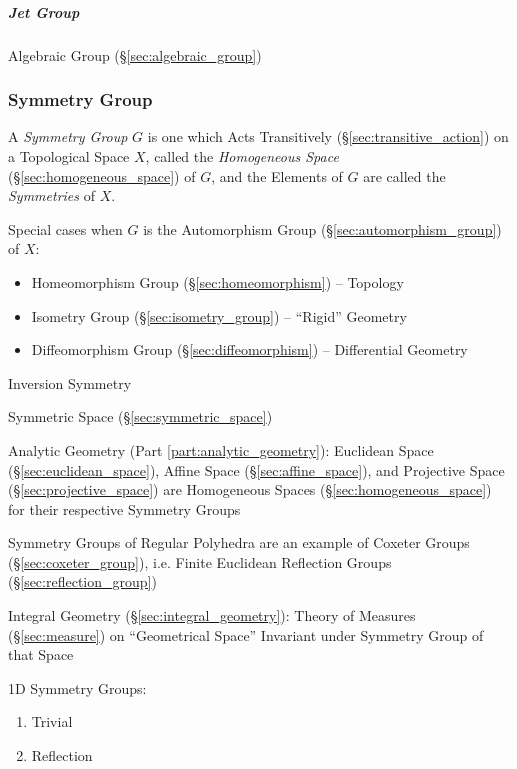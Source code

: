 \subparagraph{Jet Group}\label{sec:jet_group}\hfill

Algebraic Group (\S\ref{sec:algebraic_group})



\subsubsection{Symmetry Group}\label{sec:symmetry_group}

A \emph{Symmetry Group} $G$ is one which Acts Transitively
(\S\ref{sec:transitive_action}) on a Topological Space $X$, called the
\emph{Homogeneous Space} (\S\ref{sec:homogeneous_space}) of $G$, and the Elements
of $G$ are called the \emph{Symmetries} of $X$.

Special cases when $G$ is the Automorphism Group
(\S\ref{sec:automorphism_group}) of $X$:
\begin{itemize}
  \item Homeomorphism Group (\S\ref{sec:homeomorphism}) -- Topology
  \item Isometry Group (\S\ref{sec:isometry_group}) -- ``Rigid'' Geometry
  \item Diffeomorphism Group (\S\ref{sec:diffeomorphism}) -- Differential
    Geometry
\end{itemize}


Inversion Symmetry %

\fist Symmetric Space (\S\ref{sec:symmetric_space})

Analytic Geometry (Part \ref{part:analytic_geometry}): Euclidean Space
(\S\ref{sec:euclidean_space}), Affine Space (\S\ref{sec:affine_space}), and
Projective Space (\S\ref{sec:projective_space}) are Homogeneous Spaces
(\S\ref{sec:homogeneous_space}) for their respective Symmetry Groups

Symmetry Groups of Regular Polyhedra are an example of Coxeter Groups
(\S\ref{sec:coxeter_group}), i.e. Finite Euclidean Reflection Groups
(\S\ref{sec:reflection_group})

Integral Geometry (\S\ref{sec:integral_geometry}): Theory of Measures
(\S\ref{sec:measure}) on ``Geometrical Space'' Invariant under Symmetry Group of
that Space

1D Symmetry Groups: %
\begin{enumerate}
  \item Trivial
  \item Reflection
\end{enumerate}



